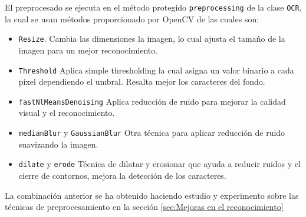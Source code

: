 El preprocesado se ejecuta en el método protegido \texttt{preprocessing} de la clase \texttt{OCR}, la cual se usan métodos proporcionado por OpenCV de las cuales son:
\begin{itemize}
	\item \texttt{Resize}. Cambia las dimensiones la imagen, lo cual ajusta el tamaño de la imagen para un mejor reconocimiento.
	\item \texttt{Threshold} Aplica simple thresholding la cual asigna un valor binario a cada píxel dependiendo el umbral. Resalta mejor los caracteres del fondo.
	\item \texttt{fastNlMeansDenoising} Aplica reducción de ruido para mejorar la calidad visual y el reconocimiento.
	\item \texttt{medianBlur} y \texttt{GaussianBlur} Otra técnica para aplicar reducción de ruido suavizando la imagen.
	\item \texttt{dilate} y \texttt{erode} Técnica de dilatar y erosionar que ayuda a reducir ruidos y el cierre de contornos, mejora la detección de los caracteres.
\end{itemize}
La combinación anterior se ha obtenido haciendo estudio y experimento sobre las técnicas de preprocesamiento en la sección \ref{sec:Mejoras en el reconocimiento}

